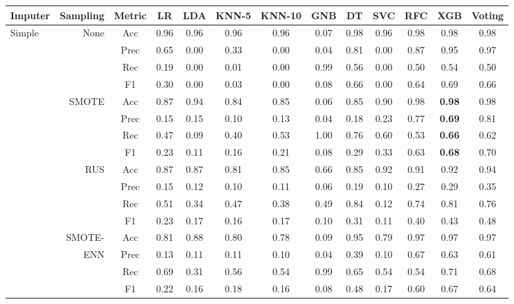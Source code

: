 \begin{table*}
\begin{narrow}{-1cm}{-1cm}
\begin{subtable}[t]{2.05\columnwidth}
    \centering
    \begin{tabular}{l|r|c|cccccccccc}
       Imputer & Sampling & Metric & LR & LDA & KNN-5 & KNN-10 & GNB & DT & SVC & RFC & XGB & Voting \\
        \hline \hline
                        
        Simple & None & Acc & 0.96 & 0.96 & 0.96 & 0.96 & 0.07 & 0.98 & 0.96 & 0.98 & 0.98 & 0.98 \\
        ~ & ~ & Prec & 0.65 & 0.00 & 0.33 & 0.00 & 0.04 & 0.81 & 0.00 & 0.87 & 0.95 & 0.97 \\
        ~ & ~ & Rec & 0.19 & 0.00 & 0.01 & 0.00 & 0.99 & 0.56 & 0.00 & 0.50 & 0.54 & 0.50 \\
        ~ & ~ & F1 & 0.30 & 0.00 & 0.03 & 0.00 & 0.08 & 0.66 & 0.00 & 0.64 & 0.69 & 0.66 \\
        \cline{2-13}
        ~ & SMOTE & Acc & 0.87 & 0.94 & 0.84 & 0.85 & 0.06 & 0.85 & 0.90 & 0.98 & \textbf{0.98} & 0.98 \\
        ~ & ~ & Prec & 0.15 & 0.15 & 0.10 & 0.13 & 0.04 & 0.18 & 0.23 & 0.77 & \textbf{0.69} & 0.81 \\
        ~ & ~ & Rec & 0.47 & 0.09 & 0.40 & 0.53 & 1.00 & 0.76 & 0.60 & 0.53 & \textbf{0.66} & 0.62 \\
        ~ & ~ & F1 & 0.23 & 0.11 & 0.16 & 0.21 & 0.08 & 0.29 & 0.33 & 0.63 & \textbf{0.68} & 0.70 \\
        \cline{2-13}
        ~ & RUS & Acc & 0.87 & 0.87 & 0.81 & 0.85 & 0.66 & 0.85 & 0.92 & 0.91 & 0.92 & 0.94 \\
        ~ & ~ & Prec & 0.15 & 0.12 & 0.10 & 0.11 & 0.06 & 0.19 & 0.10 & 0.27 & 0.29 & 0.35 \\
        ~ & ~ & Rec & 0.51 & 0.34 & 0.47 & 0.38 & 0.49 & 0.84 & 0.12 & 0.74 & 0.81 & 0.76 \\
        ~ & ~ & F1 & 0.23 & 0.17 & 0.16 & 0.17 & 0.10 & 0.31 & 0.11 & 0.40 & 0.43 & 0.48 \\
        \cline{2-13}
        ~ & SMOTE- & Acc & 0.81 & 0.88 & 0.80 & 0.78 & 0.09 & 0.95 & 0.79 & 0.97 & 0.97 & 0.97 \\
        ~ & ENN & Prec & 0.13 & 0.11 & 0.11 & 0.10 & 0.04 & 0.39 & 0.10 & 0.67 & 0.63 & 0.61 \\
        ~ & ~ & Rec & 0.69 & 0.31 & 0.56 & 0.54 & 0.99 & 0.65 & 0.54 & 0.54 & 0.71 & 0.68 \\
        ~ & ~ & F1 & 0.22 & 0.16 & 0.18 & 0.16 & 0.08 & 0.48 & 0.17 & 0.60 & 0.67 & 0.64 \\
        \hline\hline
        

\end{tabular}
\end{subtable}
\end{narrow}
\end{table*}
